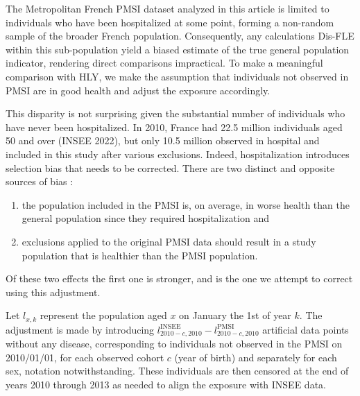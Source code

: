 \documentclass{article}
\providecommand{\tightlist}{%
  \setlength{\itemsep}{0pt}\setlength{\parskip}{0pt}}
\begin{document}
The Metropolitan French PMSI dataset analyzed in this article is limited
to individuals who have been hospitalized at some point, forming a
non-random sample of the broader French population. Consequently, any
calculations Dis-FLE within this sub-population yield a biased estimate
of the true general population indicator, rendering direct comparisons
impractical. To make a meaningful comparison with HLY, we make the
assumption that individuals not observed in PMSI are in good health and
adjust the exposure accordingly.

This disparity is not surprising given the substantial number of
individuals who have never been hospitalized. In 2010, France had 22.5
million individuals aged 50 and over (INSEE 2022), but only 10.5 million
observed in hospital and included in this study after various
exclusions. Indeed, hospitalization introduces selection bias that needs
to be corrected. There are two distinct and opposite sources of bias :

\begin{enumerate}
\def\labelenumi{\arabic{enumi}.}
\tightlist
\item
  the population included in the PMSI is, on average, in worse health
  than the general population since they required hospitalization and
\item
  exclusions applied to the original PMSI data should result in a study
  population that is healthier than the PMSI population.
\end{enumerate}

Of these two effects the first one is stronger, and is the one we
attempt to correct using this adjustment.

Let \(l_{x,k}\) represent the population aged \(x\) on January the 1st
of year \(k\). The adjustment is made by introducing
\(l_{2010-c,2010}^\text{INSEE} - l_{2010-c,2010}^\text{PMSI}\)
artificial data points without any disease, corresponding to individuals
not observed in the PMSI on 2010/01/01, for each observed cohort \(c\)
(year of birth) and separately for each sex, notation notwithstanding.
These individuals are then censored at the end of years 2010 through
2013 as needed to align the exposure with INSEE data.
\end{document}
